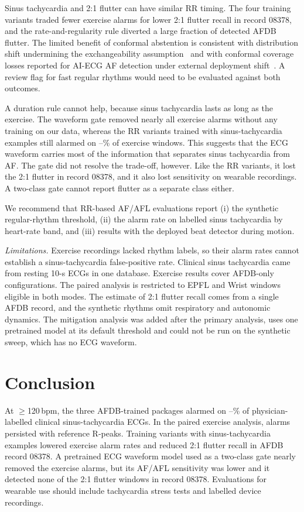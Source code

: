 \documentclass[conference,a4paper]{IEEEtran}
\begin{document}
Sinus tachycardia and 2:1 flutter can have similar RR timing. The four training variants traded fewer exercise alarms for
lower 2:1 flutter recall in record 08378, and the rate-and-regularity rule diverted a large fraction of detected AFDB
flutter. The limited benefit of conformal abstention is consistent with distribution shift undermining the exchangeability
assumption~\cite{tibshirani2019,barber2023} and with conformal coverage losses reported for AI-ECG AF detection under
external deployment shift~\cite{abbasi2026}. A review flag for fast regular rhythms would need to be evaluated against both
outcomes.

A duration rule cannot help, because sinus tachycardia lasts as long as the exercise. The waveform gate removed nearly all
exercise alarms without any training on our data, whereas the RR variants trained with sinus-tachycardia examples still
alarmed on \exVeightC--\exVsevenB\% of exercise windows. This suggests that the ECG waveform carries most of the
information that separates sinus tachycardia from AF. The gate did not resolve the trade-off, however. Like the RR variants, it lost
the 2:1 flutter in record 08378, and it also lost sensitivity on wearable recordings. A two-class gate cannot report
flutter as a separate class either.

We recommend that RR-based AF/AFL evaluations report (i) the synthetic regular-rhythm threshold, (ii) the alarm rate on labelled
sinus tachycardia by heart-rate band, and (iii) results with the deployed beat detector during motion.

\textit{Limitations.} Exercise recordings lacked rhythm labels, so their alarm rates cannot establish a sinus-tachycardia
false-positive rate. Clinical sinus tachycardia came from resting 10-s ECGs in one database. Exercise results cover
\nCfgEx{} AFDB-only configurations. The paired analysis is restricted to EPFL and Wrist windows eligible in both modes.
The estimate of 2:1 flutter recall comes from a single AFDB record, and the synthetic rhythms omit respiratory and
autonomic dynamics. The mitigation analysis was added after the primary analysis, uses one pretrained model at its default
threshold and could not be run on the synthetic sweep, which has no ECG waveform.

\section{Conclusion}
At $\geq$120\,bpm, the three AFDB-trained packages alarmed on \chapPkgMin--\chapPkgMax\% of physician-labelled clinical
sinus-tachycardia ECGs. In the paired exercise analysis, alarms persisted with reference R-peaks. Training variants with
sinus-tachycardia examples lowered exercise alarm rates and reduced 2:1 flutter recall in AFDB record 08378.
A pretrained ECG waveform model used as a two-class gate nearly removed the exercise alarms, but its AF/AFL sensitivity was
lower and it detected none of the 2:1 flutter windows in record 08378. Evaluations for wearable use should include tachycardia stress tests and labelled device recordings.
\end{document}
